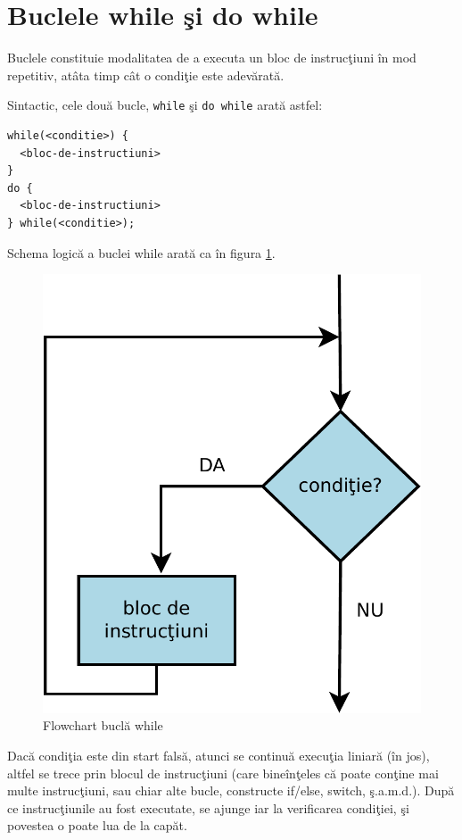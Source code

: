 \section{Buclele while şi do while}
Buclele constituie modalitatea de a executa un bloc de instrucţiuni
în mod repetitiv, atâta timp cât o condiţie este adevărată.

Sintactic, cele două bucle, \texttt{while} şi \texttt{do while} arată astfel:
\begin{lstlisting}
while(<conditie>) {
  <bloc-de-instructiuni>
}
do {
  <bloc-de-instructiuni>
} while(<conditie>);
\end{lstlisting}

Schema logică a buclei while arată ca în figura \ref{fig:flowchart while loop}.

\begin{figure}[h!]
  \centering
    \includegraphics[scale=.5]{cap02/while-crop.pdf}
  \caption{Flowchart buclă while}
  \label{fig:flowchart while loop}
\end{figure}

Dacă condiţia este din start falsă, atunci se continuă execuţia liniară ({\glqq}în jos{\grqq}),
altfel se trece prin blocul de instrucţiuni (care bineînţeles că poate
conţine mai multe instrucţiuni, sau chiar alte bucle, constructe if/else, switch, ş.a.m.d.).
După ce instrucţiunile au fost executate, se ajunge iar la verificarea condiţiei,
şi povestea o poate lua de la capăt.


